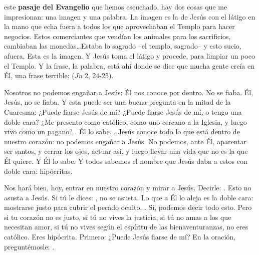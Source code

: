 \begin{body}
 este \textbf{pasaje del Evangelio} que hemos escuchado, hay dos cosas que me impresionan: una imagen y una palabra. La imagen es la de Jesús con el látigo en la mano que echa fuera a todos los que aprovechaban el Templo para hacer negocios. Estos comerciantes que vendían los animales para los sacrificios, cambiaban las monedas\ldots Estaba lo sagrado –el templo, sagrado– y esto sucio, afuera. Esta es la imagen. Y Jesús toma el látigo y procede, para limpiar un poco el Templo. Y la frase, la palabra, está ahí donde se dice que mucha gente creía en Él, una frase terrible:  (\textit{Jn} 2, 24-25).

Nosotros no podemos engañar a Jesús: Él nos conoce por dentro. No se fiaba. Él, Jesús, no se fiaba. Y esta puede ser una buena pregunta en la mitad de la Cuaresma: ¿Puede fiarse Jesús de mí? ¿Puede fiarse Jesús de mí, o tengo una doble cara? ¿Me presento como católico, como uno cercano a la Iglesia, y luego vivo como un pagano? . Él lo sabe. . Jesús conoce todo lo que está dentro de nuestro corazón: no podemos engañar a Jesús. No podemos, ante Él, aparentar ser santos, y cerrar los ojos, actuar así, y luego llevar una vida que no es la que Él quiere. Y Él lo sabe. Y todos sabemos el nombre que Jesús daba a estos con doble cara: hipócritas.

Nos hará bien, hoy, entrar en nuestro corazón y mirar a Jesús. Decirle: . Esto no asusta a Jesús. Si tú le dices: , no se asusta. Lo que a Él lo aleja es la doble cara: mostrarse justo para cubrir el pecado oculto. . Sí, podemos decir todo esto. Pero si tu corazón no es justo, si tú no vives la justicia, si tú no amas a los que necesitan amor, si tú no vives según el espíritu de las bienaventuranzas, no eres católico. Eres hipócrita. Primero: ¿Puede Jesús fiarse de mí? En la oración, preguntémosle: .


\end{body}
